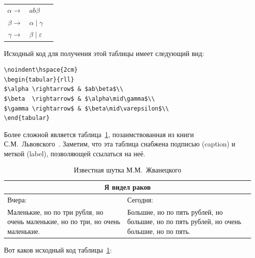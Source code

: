 \medskip
\noindent\hspace{2cm}
\begin{tabular}{rll}
$\alpha \rightarrow$ & $ab\beta$\\
$\beta  \rightarrow$ & $\alpha\mid\gamma$\\
$\gamma \rightarrow$ & $\beta\mid\varepsilon$\\
\end{tabular}
\medskip

\noindent Исходный код для получения этой таблицы имеет следующий вид:

\begin{small}
\begin{verbatim}
\noindent\hspace{2cm}
\begin{tabular}{rll}
$\alpha \rightarrow$ & $ab\beta$\\
$\beta  \rightarrow$ & $\alpha\mid\gamma$\\
$\gamma \rightarrow$ & $\beta\mid\varepsilon$\\
\end{tabular}
\end{verbatim}
\end{small}

Более сложной является таблица~\ref{tabl:crayfish}, позаимствованная из книги
С.\+М.~Львовского~\cite{rlatex}. Заметим, что эта таблица снабжена
подписью (caption) и меткой (label), позволяющей ссылаться на неё.

\begin{table}[ht!]
\caption{Известная шутка М.\+М.~Жванецкого}\label{tabl:crayfish}
\begin{center}
\begin{tabular}{|p{5cm}|p{5cm}|}
\hline
\multicolumn{2}{|c|}{\large\textbf{Я видел раков}}\\
\hline
Вчера: & Сегодня: \\
\hline
Маленькие, но по три рубля, но очень
маленькие, но по три, но очень маленькие.
&
Большие, но по пять рублей, но большие, но
по пять рублей, но очень большие,
но по пять.\\
\hline
\end{tabular}
\end{center}
\end{table}

\noindent 
Вот каков исходный код таблицы~\ref{tabl:crayfish}:

